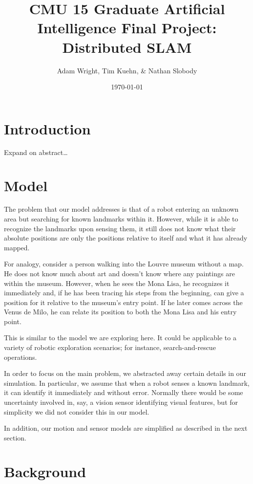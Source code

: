 \documentclass[prodmode,acmtecs]{acmsmall} %
\title{
    CMU 15\-780 Graduate Artificial Intelligence
    Final Project: Distributed SLAM
}
\author{
    Adam Wright, Tim Kuehn, \& Nathan Slobody \\
}
\date{\today}
\begin{document}
\maketitle

\setcounter{tocdepth}{2}

\section{Introduction}

Expand on abstract\ldots

\section{Model}

The problem that our model addresses is that of a robot entering an unknown area but searching for known landmarks within it.  However, while it is able to recognize the landmarks upon sensing them, it still does not know what their absolute positions are \- only the positions relative to itself and what it has already mapped.

For analogy, consider a person walking into the Louvre museum without a map.  He does not know much about art and doesn't know where any paintings are within the museum.  However, when he sees the Mona Lisa, he recognizes it immediately and, if he has been tracing his steps from the beginning, can give a position for it relative to the museum's entry point.  If he later comes across the Venus de Milo, he can relate its position to both the Mona Lisa and his entry point.

This is similar to the model we are exploring here.  It could be applicable to a variety of robotic exploration scenarios; for instance, search-and-rescue operations.

In order to focus on the main problem, we abstracted away certain details in our simulation.  In particular, we assume that when a robot senses a known landmark, it can identify it immediately and without error.  Normally there would be some uncertainty involved in, say, a vision sensor identifying visual features, but for simplicity we did not consider this in our model.

In addition, our motion and sensor models are simplified as described in the next section.

\section{Background}
\end{document}
